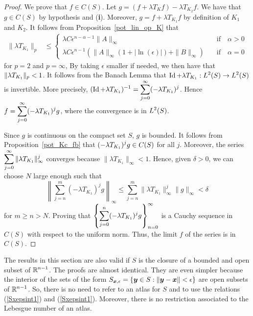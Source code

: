 \begin{proof}
 We prove that $f \in C(S)$.
Let $g = (f+ \lambda T_K f) - \lambda T_{K_2} f$.  We have that $g \in C(S)$
by hypothesis and ({\bfseries i}).  Moreover, $g=f+ \lambda T_{K_1} f$ by
definition of $K_1$ and $K_2$.  It follows from
Proposition~\ref{pot_lin_op_K} that
\begin{align*}
\| \lambda T_{K_1} \|_p & \leq
\begin{cases}
\lambda C \epsilon^{n-\alpha-1} \|A\|_{\infty} & \quad \text{if} \quad
\alpha>0 \\
\lambda C \epsilon^{n-1} \left( \|A\|_{\infty}
\left( 1 + |\ln(\epsilon)|\right) + \|B\|_\infty \right) & \quad \text{if} \quad
\alpha=0
\end{cases}
\end{align*}
for $p=2$ and $p=\infty$,  By taking $\epsilon$ smaller if needed, we
then have that $\displaystyle \| \lambda T_{K_1} \|_p < 1$.
It follows from
the Banach Lemma that
$\displaystyle \operatorname{Id} + \lambda T_{K_1}:L^2(S) \rightarrow L^2(S)$ is
invertible.  More precisely,
$\displaystyle (\operatorname{Id} + \lambda T_{K_1})^{-1} = \sum_{j=0}^\infty
(-\lambda T_{K_1})^j$.
Hence $\displaystyle f = \sum_{j=0}^\infty (-\lambda T_{K_1})^j g$, where the
convergence is in $\displaystyle L^2(S)$.

Since $g$ is continuous on the compact set $S$, $g$ is bounded.  It
follows from Proposition~\ref{pot_Kc_fb} that
$\displaystyle (-\lambda T_{K_1})^j g\in C(S)$ for all $j$.  Moreover,
the series $\displaystyle \sum_{j=0}^\infty \|\lambda T_{K_1}\|_\infty^j$
converges because $\|\lambda T_{K_1}\|_\infty <1$.  Hence,
given $\delta>0$, we can choose $N$ large enough such that
\[
\left\| \sum_{j=n}^m (-\lambda T_{K_1})^j g \right\|_\infty \leq
\sum_{j=n}^m \|\lambda T_{K_1}\|_\infty^j \|g\|_\infty < \delta
\]
for $m\geq n >N$.  Proving that
$\displaystyle
\left\{ \sum_{j=0}^n (-\lambda T_{K_1})^j g \right\}_{n=0}^\infty$ is a
Cauchy sequence in $C(S)$ with respect to the uniform norm.  Thus, the
limit $f$ of the series is in $C(S)$.
\end{proof}

\begin{rmk}
The results in this section are also valid if $S$
is the closure of a bounded and open subset of $\displaystyle \mathbb{R}^{n-1}$.
The proofs are almost identical.  They are even simpler because
the interior of the sets of the form
$\displaystyle S_{{\bm{x}},\epsilon} = \left\{{\bm{y}} \in S :
\|{\bm{y}}-{\bm{x}}\| < \epsilon \right\}$ are open subsets of
$\displaystyle \mathbb{R}^{n-1}$.
So, there is no need to refer to an atlas for $S$ and to use the
relations (\ref{Sxepsint1}) and (\ref{Sxepsint1}).  Moreover, there is
no restriction associated to the Lebesgue number of an atlas.
\end{rmk}

